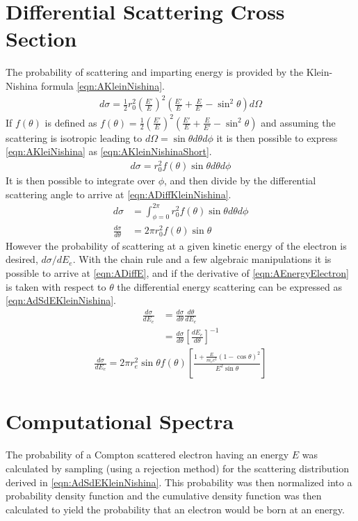 \section{Differential Scattering Cross Section}
The probability of scattering and imparting energy is provided by the Klein-Nishina formula \eqref{eqn:AKleinNishina}.
\begin{align}
  \label{eqn:AKleinNishina}
  d\sigma = \frac{1}{2} r_0^2 \left(\frac{E'}{E}\right)^2 \left(\frac{E'}{E} + \frac{E}{E'}-\sin^2\theta\right)d\Omega
\end{align}
If $f(\theta)$ is defined as $f(\theta) = \frac{1}{2}\left(\frac{E'}{E}\right)^2 \left(\frac{E'}{E} + \frac{E}{E'}-\sin^2\theta\right)$ and assuming the scattering is isotropic leading to $d\Omega = \sin\theta d\theta d\phi$ it is then possible to express \eqref{eqn:AKleiNishina} as \eqref{eqn:AKleinNishinaShort}.
\begin{align}
  \label{eqn:AKleinNishinaShort}
    d\sigma = r_0^2 f(\theta)\sin\theta d\theta d\phi
\end{align}
It is then possible to integrate over $\phi$, and then divide by the differential scattering angle to arrive at \eqref{eqn:ADiffKleinNishina}.
\begin{align}
  \label{eqn:ADiffKleinNishina}
  d\sigma &=\int_{\phi=0}^{2\pi} r_0^2 f(\theta)\sin\theta d\theta d\phi\\
  \frac{d\sigma}{d\theta} &=2\pi r_0^2 f(\theta)\sin\theta
\end{align}
However the probability of scattering at a given kinetic energy of the electron is desired, $d\sigma/dE_e$.
With the chain rule and a few algebraic manipulations it is possible to arrive at \eqref{eqn:ADiffE}, and if the derivative of \eqref{eqn:AEnergyElectron} is taken with respect to $\theta$ the differential energy scattering can be expressed as \eqref{eqn:AdSdEKleinNishina}.
\begin{align}
  \label{eqn:ADiffE}
  \frac{d\sigma}{dE_e} & = \frac{d\sigma}{d\theta} \frac{d\theta}{dE_e} \\
   & = \frac{d\sigma}{d\theta} \left[\frac{dE_e}{d\theta}\right]^{-1} 
\end{align}
\begin{align}
  \label{eqn:AdSdEKleinNishina}
\frac{d\sigma}{dE_e} = 2\pi r_e^2 \sin \theta f(\theta)\left [ \frac{1+\frac{E}{m_e c^2}\left(1-\cos\theta \right)^2}{E^2 \sin \theta} \right ]
\end{align}

\section{Computational Spectra}
The probability of a Compton scattered electron having an energy $E$ was calculated by sampling (using a rejection method) for the scattering distribution derived in \autoref{eqn:AdSdEKleinNishina}.
This probability was then normalized into a probability density function and the cumulative density function was then calculated to yield the probability that an electron would be born at an energy.

